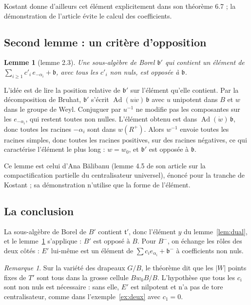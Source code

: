 \documentclass[11pt,a4paper]{amsart}
\theoremstyle{definition}
\theoremstyle{plain}
\newtheorem{lemme}{Lemme}
\theoremstyle{remark}
\newtheorem{remarque}{Remarque}
\newcommand{\tl}{\mathfrak t}
\newcommand{\bl}{\mathfrak b}
\begin{document}
Kostant donne d'ailleurs cet élément explicitement dans son théorème 6.7 ; la démonstration de l'article évite le calcul des coefficients.

\subsection{Second lemme : un critère d'opposition}

\begin{lemme}[lemme 2.3]\label{lem:opposite}
Une sous-algèbre de Borel $\bl'$ qui contient un élément de $\sum_{i\ge1} c'_i\, e_{-\alpha_i} + \bl$, avec tous les $c'_i$ non nuls, est opposée à $\bl$.
\end{lemme}

L'idée est de lire la position relative de $\bl'$ sur l'élément qu'elle contient. Par la décomposition de Bruhat, $\bl'$ s'écrit $\operatorname{Ad}(u\dot w)\,\bl$ avec $u$ unipotent dans $B$ et $w$ dans le groupe de Weyl. Conjuguer par $u^{-1}$ ne modifie pas les composantes sur les $e_{-\alpha_i}$, qui restent toutes non nulles. L'élément obtenu est dans $\operatorname{Ad}(\dot w)\,\bl$, donc toutes les racines $-\alpha_i$ sont dans $w(R^+)$. Alors $w^{-1}$ envoie toutes les racines simples, donc toutes les racines positives, sur des racines négatives, ce qui caractérise l'élément le plus long : $w = w_0$, et $\bl'$ est opposée à $\bl$.

Ce lemme est celui d'Ana Bălibanu (lemme 4.5 de son article sur la compactification partielle du centralisateur universel), énoncé pour la tranche de Kostant ; sa démonstration n'utilise que la forme de l'élément.

\subsection{La conclusion}

La sous-algèbre de Borel de $B'$ contient $\tl'$, donc l'élément $y$ du lemme~\ref{lem:dual}, et le lemme~\ref{lem:opposite} s'applique : $B'$ est opposé à $B$. Pour $B^-$, on échange les rôles des deux côtés : $E'$ lui-même est un élément de $\sum c_i e_{\alpha_i} + \bl^-$ à coefficients non nuls.

\begin{remarque}
Sur la variété des drapeaux $G/B$, le théorème dit que les $|W|$ points fixes de $T'$ sont tous dans la grosse cellule $Bw_0B/B$. L'hypothèse que tous les $c_i$ sont non nuls est nécessaire : sans elle, $E'$ est nilpotent et n'a pas de tore centralisateur, comme dans l'exemple~\ref{ex:deux} avec $c_1 = 0$.
\end{remarque}
\end{document}
